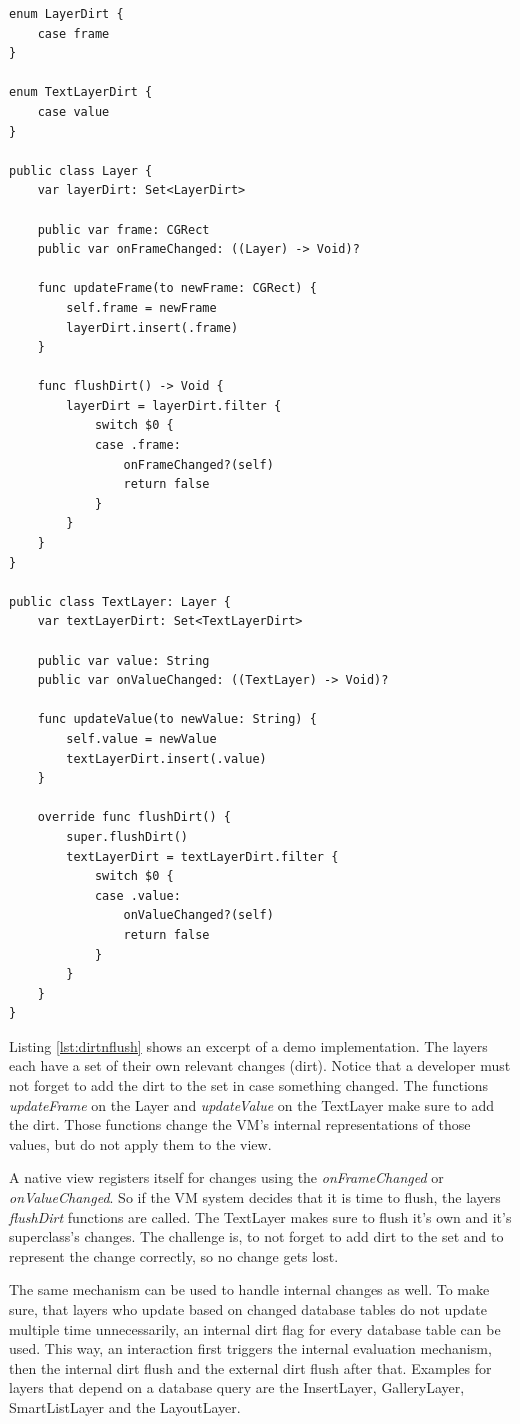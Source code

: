 \begin{lstlisting}[style=swift, caption={Key data structures of dirt and flush}, label={lst:dirtnflush}]
enum LayerDirt {
	case frame
}

enum TextLayerDirt {
	case value
}

public class Layer {
	var layerDirt: Set<LayerDirt>
	
	public var frame: CGRect
	public var onFrameChanged: ((Layer) -> Void)?
	
	func updateFrame(to newFrame: CGRect) {
		self.frame = newFrame
		layerDirt.insert(.frame)
	}
	
	func flushDirt() -> Void {
		layerDirt = layerDirt.filter {
			switch $0 {
			case .frame:
				onFrameChanged?(self)
				return false
			}
		}
	}
}

public class TextLayer: Layer {
	var textLayerDirt: Set<TextLayerDirt>

	public var value: String
	public var onValueChanged: ((TextLayer) -> Void)?
	
	func updateValue(to newValue: String) {
		self.value = newValue
		textLayerDirt.insert(.value)
	}
	
	override func flushDirt() {
		super.flushDirt()
		textLayerDirt = textLayerDirt.filter {
			switch $0 {
			case .value:
				onValueChanged?(self)
				return false
			}
		}
	}
}
\end{lstlisting}

Listing \ref{lst:dirtnflush} shows an excerpt of a demo implementation.
The layers each have a set of their own relevant changes (dirt).
Notice that a developer must not forget to add the dirt to the set in case something changed.
The functions \textit{updateFrame} on the Layer and \textit{updateValue} on the TextLayer make sure to add the dirt.
Those functions change the \ac{VM}'s internal representations of those values, but do not apply them to the view.

A native view registers itself for changes using the \textit{onFrameChanged} or \textit{onValueChanged}.
So if the \ac{VM} system decides that it is time to flush, the layers \textit{flushDirt} functions are called.
The TextLayer makes sure to flush it's own and it's superclass's changes.
The challenge is, to not forget to add dirt to the set and to represent the change correctly, so no change gets lost.

The same mechanism can be used to handle internal changes as well.
To make sure, that layers who update based on changed database tables do not update multiple time unnecessarily, an internal dirt flag for every database table can be used.
This way, an interaction first triggers the internal evaluation mechanism, then the internal dirt flush and the external dirt flush after that.
Examples for layers that depend on a database query are the InsertLayer, GalleryLayer, SmartListLayer and the LayoutLayer.


